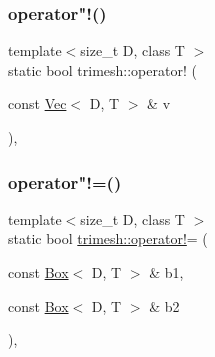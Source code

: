 \mbox{\label{namespacetrimesh_a80920d20f09f03aa64fa58ada7031645}} 
\subsubsection{\texorpdfstring{operator"!()}{operator!()}\hspace{0.1cm}{\footnotesize\ttfamily [2/2]}}
{\footnotesize\ttfamily template$<$size\+\_\+t D, class T $>$ \\
static bool trimesh\+::operator! (\begin{DoxyParamCaption}\item[{const \hyperlink{classtrimesh_1_1Vec}{Vec}$<$ D, T $>$ \&}]{v }\end{DoxyParamCaption})\hspace{0.3cm}{\ttfamily [inline]}, {\ttfamily [static]}}

\mbox{\label{namespacetrimesh_a8c828bc153a668d172ff22788f17d5a9}} 
\subsubsection{\texorpdfstring{operator"!=()}{operator!=()}\hspace{0.1cm}{\footnotesize\ttfamily [1/3]}}
{\footnotesize\ttfamily template$<$size\+\_\+t D, class T $>$ \\
static bool \hyperlink{namespacetrimesh_af767195cb37f08a930059365eb736329}{trimesh\+::operator!}= (\begin{DoxyParamCaption}\item[{const \hyperlink{classtrimesh_1_1Box}{Box}$<$ D, T $>$ \&}]{b1,  }\item[{const \hyperlink{classtrimesh_1_1Box}{Box}$<$ D, T $>$ \&}]{b2 }\end{DoxyParamCaption})\hspace{0.3cm}{\ttfamily [inline]}, {\ttfamily [static]}}

\mbox{\label{namespacetrimesh_af68c94d9209a2ccfd35ba698a1385be4}} 
